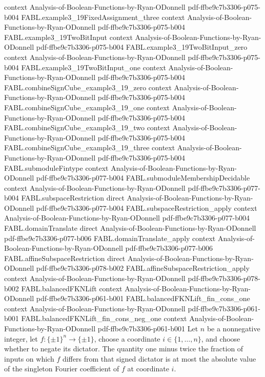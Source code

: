 \begin{theorem}
  {context}
  {Analysis-of-Boolean-Functions-by-Ryan-ODonnell}
  {pdf-ffbe9c7b3306-p075-b004}
\proofstep
  {FABL.example3_19FixedAssignment_three}
  {context}
  {Analysis-of-Boolean-Functions-by-Ryan-ODonnell}
  {pdf-ffbe9c7b3306-p075-b004}
\proofstep
  {FABL.example3_19TwoBitInput}
  {context}
  {Analysis-of-Boolean-Functions-by-Ryan-ODonnell}
  {pdf-ffbe9c7b3306-p075-b004}
\proofstep
  {FABL.example3_19TwoBitInput_zero}
  {context}
  {Analysis-of-Boolean-Functions-by-Ryan-ODonnell}
  {pdf-ffbe9c7b3306-p075-b004}
\proofstep
  {FABL.example3_19TwoBitInput_one}
  {context}
  {Analysis-of-Boolean-Functions-by-Ryan-ODonnell}
  {pdf-ffbe9c7b3306-p075-b004}
\proofstep
  {FABL.combineSignCube_example3_19_zero}
  {context}
  {Analysis-of-Boolean-Functions-by-Ryan-ODonnell}
  {pdf-ffbe9c7b3306-p075-b004}
\proofstep
  {FABL.combineSignCube_example3_19_one}
  {context}
  {Analysis-of-Boolean-Functions-by-Ryan-ODonnell}
  {pdf-ffbe9c7b3306-p075-b004}
\proofstep
  {FABL.combineSignCube_example3_19_two}
  {context}
  {Analysis-of-Boolean-Functions-by-Ryan-ODonnell}
  {pdf-ffbe9c7b3306-p075-b004}
\proofstep
  {FABL.combineSignCube_example3_19_three}
  {context}
  {Analysis-of-Boolean-Functions-by-Ryan-ODonnell}
  {pdf-ffbe9c7b3306-p075-b004}
\proofstep
  {FABL.submoduleFintype}
  {context}
  {Analysis-of-Boolean-Functions-by-Ryan-ODonnell}
  {pdf-ffbe9c7b3306-p077-b004}
\proofstep
  {FABL.submoduleMembershipDecidable}
  {context}
  {Analysis-of-Boolean-Functions-by-Ryan-ODonnell}
  {pdf-ffbe9c7b3306-p077-b004}
\proofstep
  {FABL.subspaceRestriction}
  {direct}
  {Analysis-of-Boolean-Functions-by-Ryan-ODonnell}
  {pdf-ffbe9c7b3306-p077-b004}
\proofstep
  {FABL.subspaceRestriction_apply}
  {context}
  {Analysis-of-Boolean-Functions-by-Ryan-ODonnell}
  {pdf-ffbe9c7b3306-p077-b004}
\proofstep
  {FABL.domainTranslate}
  {direct}
  {Analysis-of-Boolean-Functions-by-Ryan-ODonnell}
  {pdf-ffbe9c7b3306-p077-b006}
\proofstep
  {FABL.domainTranslate_apply}
  {context}
  {Analysis-of-Boolean-Functions-by-Ryan-ODonnell}
  {pdf-ffbe9c7b3306-p077-b006}
\proofstep
  {FABL.affineSubspaceRestriction}
  {direct}
  {Analysis-of-Boolean-Functions-by-Ryan-ODonnell}
  {pdf-ffbe9c7b3306-p078-b002}
\proofstep
  {FABL.affineSubspaceRestriction_apply}
  {context}
  {Analysis-of-Boolean-Functions-by-Ryan-ODonnell}
  {pdf-ffbe9c7b3306-p078-b002}
\proofstep
  {FABL.balancedFKNLift}
  {context}
  {Analysis-of-Boolean-Functions-by-Ryan-ODonnell}
  {pdf-ffbe9c7b3306-p061-b001}
\proofstep
  {FABL.balancedFKNLift_fin_cons_one}
  {context}
  {Analysis-of-Boolean-Functions-by-Ryan-ODonnell}
  {pdf-ffbe9c7b3306-p061-b001}
\proofstep
  {FABL.balancedFKNLift_fin_cons_neg_one}
  {context}
  {Analysis-of-Boolean-Functions-by-Ryan-ODonnell}
  {pdf-ffbe9c7b3306-p061-b001}
Let $n$ be a nonnegative integer, let $f:\{\pm1\}^n\to\{\pm1\}$, choose a coordinate
$i\in\{1,\ldots,n\}$, and choose whether to negate its dictator. The quantity one minus
twice the fraction of inputs on which $f$ differs from that signed dictator is at most
the absolute value of the singleton Fourier coefficient of $f$ at coordinate $i$.
\end{theorem}

